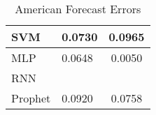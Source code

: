 \documentclass{beamer}
\begin{document}
\begin{frame}
\begin{table}
{\begin{tabular}{|lll|}
					\multicolumn{1}{|l|}{SVM}     & \multicolumn{1}{l|}{0.0730}       & \multicolumn{1}{c|}{0.0965}  \\ \hline
					\multicolumn{1}{|l|}{MLP}     & \multicolumn{1}{l|}{0.0648}       & \multicolumn{1}{c|}{0.0050}  \\ \hline
					\multicolumn{1}{|l|}{RNN}     & \multicolumn{1}{l|}{}       & \multicolumn{1}{c|}{}  \\ \hline
					\multicolumn{1}{|l|}{Prophet} & \multicolumn{1}{l|}{0.0920}       & \multicolumn{1}{c|}{0.0758}  \\ \hline
				\end{tabular}
				\caption{American Forecast Errors}
			}
		\end{table}
		
	\end{frame}
\end{document}
